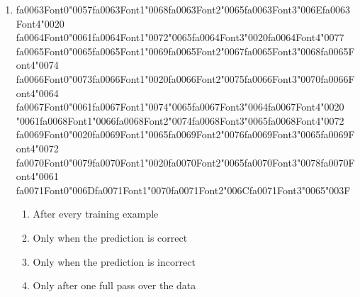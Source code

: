 \documentclass[12pt]{article}
\begin{document}
\begin{enumerate}[label=Q\arabic*.]
\item {\csname fa0063Font0\endcsname\char"0057}{\csname fa0063Font1\endcsname\char"0068}{\csname fa0063Font2\endcsname\char"0065}{\csname fa0063Font3\endcsname\char"006E}{\csname fa0063Font4\endcsname\char"0020} {\csname fa0064Font0\endcsname\char"0061}{\csname fa0064Font1\endcsname\char"0072}{\char"0065}{\csname fa0064Font3\endcsname\char"0020}{\csname fa0064Font4\endcsname\char"0077} {\csname fa0065Font0\endcsname\char"0065}{\csname fa0065Font1\endcsname\char"0069}{\csname fa0065Font2\endcsname\char"0067}{\csname fa0065Font3\endcsname\char"0068}{\csname fa0065Font4\endcsname\char"0074} {\csname fa0066Font0\endcsname\char"0073}{\csname fa0066Font1\endcsname\char"0020}{\csname fa0066Font2\endcsname\char"0075}{\csname fa0066Font3\endcsname\char"0070}{\csname fa0066Font4\endcsname\char"0064} {\csname fa0067Font0\endcsname\char"0061}{\csname fa0067Font1\endcsname\char"0074}{\char"0065}{\csname fa0067Font3\endcsname\char"0064}{\csname fa0067Font4\endcsname\char"0020} {\char"0061}{\csname fa0068Font1\endcsname\char"0066}{\csname fa0068Font2\endcsname\char"0074}{\csname fa0068Font3\endcsname\char"0065}{\csname fa0068Font4\endcsname\char"0072} {\csname fa0069Font0\endcsname\char"0020}{\csname fa0069Font1\endcsname\char"0065}{\csname fa0069Font2\endcsname\char"0076}{\csname fa0069Font3\endcsname\char"0065}{\csname fa0069Font4\endcsname\char"0072} {\csname fa0070Font0\endcsname\char"0079}{\csname fa0070Font1\endcsname\char"0020}{\csname fa0070Font2\endcsname\char"0065}{\csname fa0070Font3\endcsname\char"0078}{\csname fa0070Font4\endcsname\char"0061} {\csname fa0071Font0\endcsname\char"006D}{\csname fa0071Font1\endcsname\char"0070}{\csname fa0071Font2\endcsname\char"006C}{\csname fa0071Font3\endcsname\char"0065}{\char"003F}
\begin{enumerate}[label=(\Alph*)]
    \item After every training example
    \item Only when the prediction is correct
    \item Only when the prediction is incorrect
    \item Only after one full pass over the data
\end{enumerate}

\end{enumerate}
\end{document}
